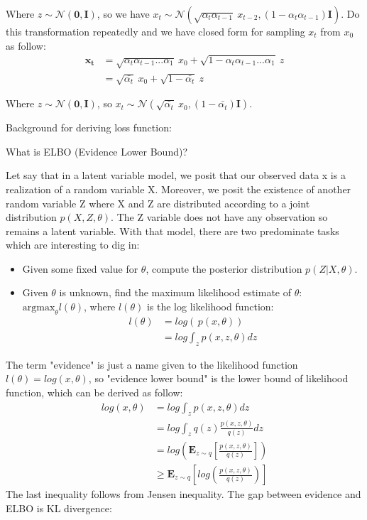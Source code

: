 \documentclass[11pt, oneside]{article}   	%
\begin{document}
Where ${z \sim \mathcal{N}(\mathbf{0}, \mathbf{I})}$, so we have ${x_{t} \sim \mathcal{N}(\sqrt{\alpha_{t}\alpha_{t-1}}\:x_{t-2}, (1-\alpha_{t}\alpha_{t-1})\mathbf{I})}$. Do this transformation repeatedly and we have closed form for sampling $x_{t}$ from $x_{0}$ as follow:
\begin{align}
	\mathbf{x_{t}}
	&= \sqrt{\alpha_{t}\alpha_{t-1}...\alpha_{1}}\:x_{0} + \sqrt{1-\alpha_{t}\alpha_{t-1}...\alpha_{1}}\:z \\
	&= \sqrt{\bar{\alpha_{t}}}\:x_{0} + \sqrt{1-\bar{\alpha_{t}}}\:z
\end{align}

Where ${z \sim \mathcal{N}(\mathbf{0}, \mathbf{I})}$, so ${x_{t} \sim \mathcal{N}(\sqrt{\bar{\alpha_{t}}}\:x_{0}, (1-\bar{\alpha_{t}})\mathbf{I})}$.

\vspace{1cm}
Background for deriving loss function:

What is ELBO (Evidence Lower Bound)?

\hspace{0.5cm} Let say that in a latent variable model, we posit that our observed data x is a realization of a random variable X. Moreover, we posit the existence of another random variable Z where X and Z are distributed according to a joint distribution $p(X, Z, \theta)$. The Z variable does not have any observation so remains a latent variable. With that model, there are two predominate tasks which are interesting to dig in:
\begin{itemize}
	\item Given some fixed value for $\theta$, compute the posterior distribution $p(Z | X, \theta)$.
	\item Given $\theta$ is unknown, find the maximum likelihood estimate of $\theta$: $\text{argmax}_{\theta}l(\theta)$, where $l(\theta)$ is the log likelihood function:
	\begin{align*}
		l(\theta)
		&=log\left(\,p(x, \theta)\right) \\
		&=log\int_{z}p(x, z, \theta)dz
	\end{align*}
\end{itemize}

The term "evidence" is just a name given to the likelihood function $l(\theta) = log(x, \theta)$, so "evidence lower bound" is the lower bound of likelihood function, which can be derived as follow:
\begin{align*}
	log(x, \theta)
	&=log\int_{z}p(x, z, \theta)dz \\
	&=log\int_{z}q(z) \frac{p(x, z, \theta)}{q(z)}dz \\
	&=log\left(\mathbf{E}_{z\sim q}\left[\frac{p(x, z, \theta)}{q(z)}\right]\right) \\
	&\geq \mathbf{E}_{z \sim q}\left[log\left(\frac{p(x, z, \theta)}{q(z)}\right)\right]
\end{align*}
The last inequality follows from Jensen inequality. The gap between evidence and ELBO is KL divergence:
\end{document}
